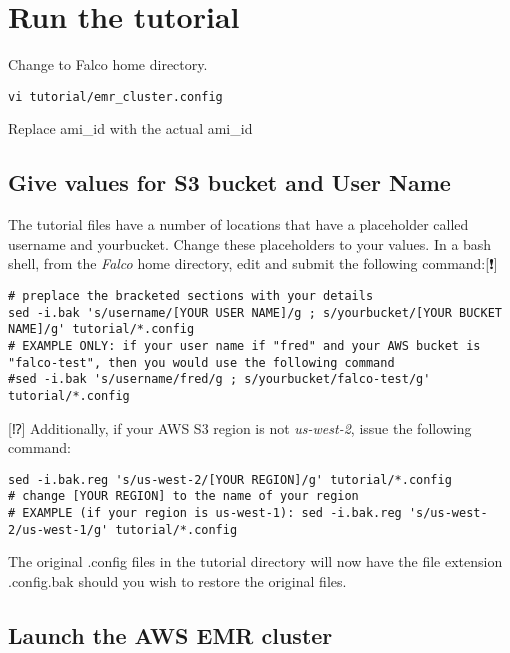 \documentclass[]{book}
\begin{document}
\hypertarget{run-the-tutorial}{%
\chapter{Run the tutorial}\label{run-the-tutorial}}

Change to Falco home directory.

\begin{verbatim}
vi tutorial/emr_cluster.config
\end{verbatim}

Replace ami\_id with the actual ami\_id

\hypertarget{give-values-for-s3-bucket-and-user-name}{%
\section{Give values for S3 bucket and User Name}\label{give-values-for-s3-bucket-and-user-name}}

The tutorial files have a number of locations that have a placeholder called username and yourbucket. Change these placeholders to your values. In a bash shell, from the \emph{Falco} home directory, edit and submit the following command:{[}❗️{]}

\begin{verbatim}
# preplace the bracketed sections with your details
sed -i.bak 's/username/[YOUR USER NAME]/g ; s/yourbucket/[YOUR BUCKET NAME]/g' tutorial/*.config
# EXAMPLE ONLY: if your user name if "fred" and your AWS bucket is "falco-test", then you would use the following command
#sed -i.bak 's/username/fred/g ; s/yourbucket/falco-test/g' tutorial/*.config
\end{verbatim}

{[}⁉️{]} Additionally, if your AWS S3 region is not \emph{us-west-2}, issue the following command:

\begin{verbatim}
sed -i.bak.reg 's/us-west-2/[YOUR REGION]/g' tutorial/*.config
# change [YOUR REGION] to the name of your region
# EXAMPLE (if your region is us-west-1): sed -i.bak.reg 's/us-west-2/us-west-1/g' tutorial/*.config
\end{verbatim}

The original .config files in the tutorial directory will now have the file extension .config.bak should you wish to restore the original files.

\hypertarget{launch-the-aws-emr-cluster}{%
\section{Launch the AWS EMR cluster}\label{launch-the-aws-emr-cluster}}
\end{document}
